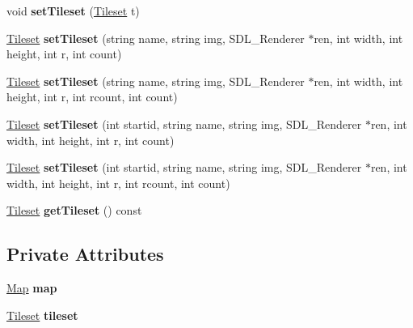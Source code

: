 \begin{DoxyCompactItemize}
\item 
void {\bfseries set\+Tileset} (\hyperlink{classTileset}{Tileset} t)\hypertarget{classStage_a63a19b471f7c54d68f3f7e4419eca8ac}{}\label{classStage_a63a19b471f7c54d68f3f7e4419eca8ac}

\item 
\hyperlink{classTileset}{Tileset} {\bfseries set\+Tileset} (string name, string img, S\+D\+L\+\_\+\+Renderer $\ast$ren, int width, int height, int r, int count)\hypertarget{classStage_ab62ad01c46da0337c294c4790020306f}{}\label{classStage_ab62ad01c46da0337c294c4790020306f}

\item 
\hyperlink{classTileset}{Tileset} {\bfseries set\+Tileset} (string name, string img, S\+D\+L\+\_\+\+Renderer $\ast$ren, int width, int height, int r, int rcount, int count)\hypertarget{classStage_a6e71c30197676d98a4a5694ad8b5a733}{}\label{classStage_a6e71c30197676d98a4a5694ad8b5a733}

\item 
\hyperlink{classTileset}{Tileset} {\bfseries set\+Tileset} (int startid, string name, string img, S\+D\+L\+\_\+\+Renderer $\ast$ren, int width, int height, int r, int count)\hypertarget{classStage_ab90d4d0315e6991f2ed8216b6c804339}{}\label{classStage_ab90d4d0315e6991f2ed8216b6c804339}

\item 
\hyperlink{classTileset}{Tileset} {\bfseries set\+Tileset} (int startid, string name, string img, S\+D\+L\+\_\+\+Renderer $\ast$ren, int width, int height, int r, int rcount, int count)\hypertarget{classStage_a42ee2fbdb79971f90984f603fcad54d6}{}\label{classStage_a42ee2fbdb79971f90984f603fcad54d6}

\item 
\hyperlink{classTileset}{Tileset} {\bfseries get\+Tileset} () const \hypertarget{classStage_a7c41f0bf5dcdac398169c5a2e92196f3}{}\label{classStage_a7c41f0bf5dcdac398169c5a2e92196f3}

\end{DoxyCompactItemize}
\subsection*{Private Attributes}
\begin{DoxyCompactItemize}
\item 
\hyperlink{classMap}{Map} {\bfseries map}\hypertarget{classStage_acd462363f1438577ea16bb7b6407eb66}{}\label{classStage_acd462363f1438577ea16bb7b6407eb66}

\item 
\hyperlink{classTileset}{Tileset} {\bfseries tileset}\hypertarget{classStage_a263a0cbb2777538824425edf15b5f224}{}\label{classStage_a263a0cbb2777538824425edf15b5f224}

\end{DoxyCompactItemize}


